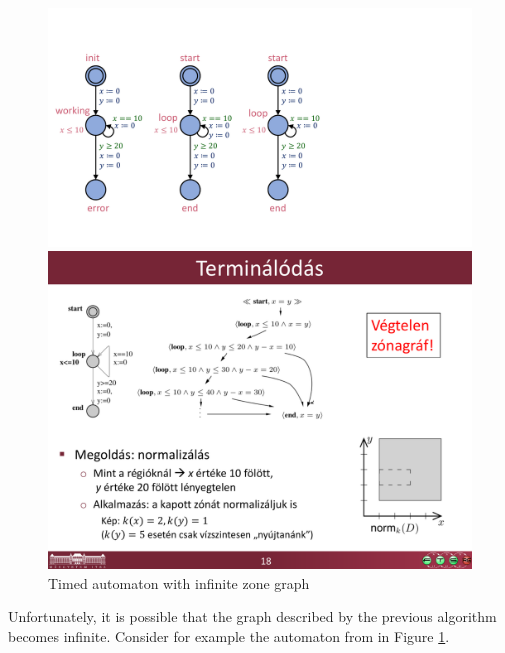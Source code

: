 \begin{figure} [b]
	\centering
	\begin{minipage}[c] {0.25\linewidth}%
		\includegraphics [width=\textwidth]{include/figures/loop_example_original}%
	\end{minipage}%
	\begin{minipage}[c] {0.7\linewidth}%
		\includegraphics [width=\textwidth] {include/figures/loop_original_zonegraph}%
	\end{minipage}
	\caption{Timed automaton with infinite zone graph}
	\label{fig:loopinfinite}
\end{figure} 

Unfortunately, it is possible that the graph described by the previous algorithm becomes infinite. Consider for example the automaton from \cite{bengtsson2004timed} in Figure \ref{fig:loopinfinite}.

